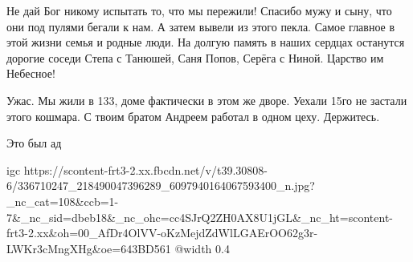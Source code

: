  
 
 
 
 

\qqSecCmt


Не дай Бог никому испытать то, что мы пережили! Спасибо мужу и сыну, что они
под пулями бегали к нам. А затем вывели из этого пекла. Самое главное в этой
жизни семья и родные люди. На долгую память в наших сердцах останутся дорогие
соседи Степа с Танюшей, Саня Попов, Серёга с Ниной. Царство им Небесное!


Ужас. Мы жили в 133, доме фактически в этом же дворе. Уехали 15го не застали
этого кошмара. С твоим братом Андреем работал в одном цеху. Держитесь.


Это был ад


\ifcmt
  igc https://scontent-frt3-2.xx.fbcdn.net/v/t39.30808-6/336710247_218490047396289_6097940164067593400_n.jpg?_nc_cat=108&ccb=1-7&_nc_sid=dbeb18&_nc_ohc=cc4SJrQ2ZH0AX8U1jGL&_nc_ht=scontent-frt3-2.xx&oh=00_AfDr4OlVV-oKzMejdZdWlLGAErOO62g3r-LWKr3cMngXHg&oe=643BD561
	@width 0.4
\fi
